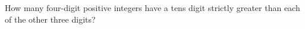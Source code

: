 How many four-digit positive integers have a tens digit strictly greater than each of the other three digits?
